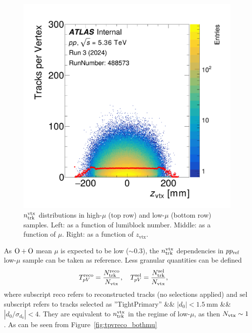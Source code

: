\begin{figure}[h]
    \includegraphics[width=0.32\linewidth]{images/tpv_zvtx_low_h2d_tpv_zvtx_488573.png}
    \caption{$n_\text{trk}^\text{vtx}$ distributions in high-$\mu$ (top row) and low-$\mu$ (bottom row) samples. Left: as a function of lumiblock number. Middle: as a function of $\mu$. Right: as a function of $z_\text{vtx}$.}
    \label{fig:highmu_lowmu_tpv}
\end{figure}

As $\OO$ mean $\mu$ is expected to be low ($\sim 0.3$), the $n_\text{trk}^\text{vtx}$ dependencies in $pp_{\mathrm{ref}}$ low-$\mu$ sample can be taken as reference. Less granular quantities can be defined
\begin{equation}
    T_{pV}^\text{reco} = \frac{N_\text{trk}^\text{reco}}{N_\text{vtx}}, \quad 
    T_{pV}^\text{sel} = \frac{N_\text{trk}^\text{sel}}{N_\text{vtx}}, \quad 
\end{equation}
where subscript $\text{reco}$ refers to reconstructed tracks (no selections applied) and $\text{sel}$ subscript refers to tracks selected as ''TightPrimary'' \&\& $|d_0|<\qty{1.5}{\mm}$ \&\& $|d_0/\sigma_{d_0}|<4$. 
They are equivalent to $n_\text{trk}^\text{vtx}$ in the regime of low-$\mu$, as then $N_\text{vtx} \sim 1$. As can be seen from Figure~\ref{fig:tpvreco_bothmu}




